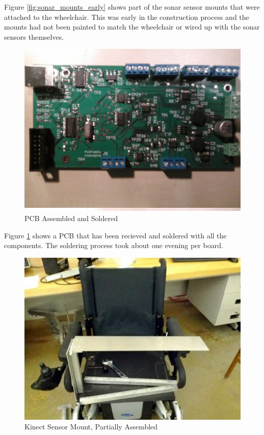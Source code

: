 \documentclass[oneside,final,a4paper]{report}
\begin{document}
Figure \ref{fig:sonar_mounts_early} shows part of the sonar sensor mounts that were attached to the wheelchair. This was early in the construction process and the mounts had not been painted to match the wheelchair or wired up with the sonar sensors themselves.

\begin{figure}[hbt]
 \centering
 \includegraphics[scale=0.35]{solder_complete}
 \caption{PCB Assembled and Soldered}
 \label{fig:PCB_assem}
\end{figure}

Figure \ref{fig:PCB_assem} shows a PCB that has been recieved and soldered with all the components. The soldering process took about one evening per board.

\begin{figure}[hbt]
 \centering
 \includegraphics[scale=0.35]{Kinect_Shelf}
 \caption{Kinect Sensor Mount, Partially Assembled}
 \label{fig:kinect_partial}
\end{figure}
\end{document}
